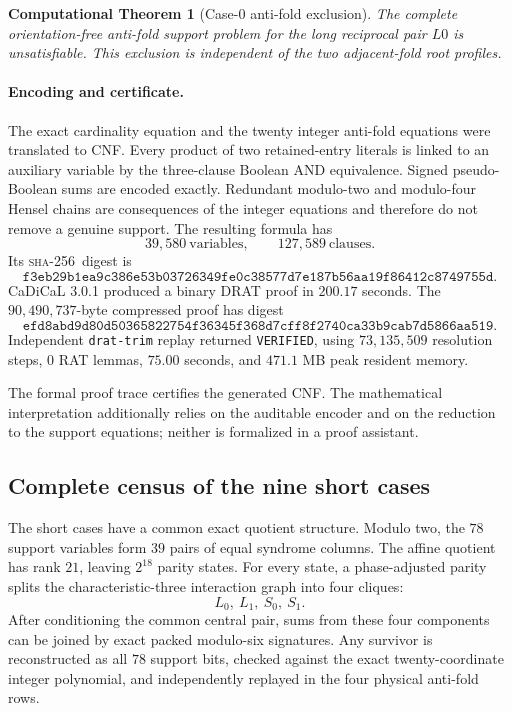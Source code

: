 \documentclass[11pt]{article}
\newtheorem{computationaltheorem}[theorem]{Computational Theorem}
\theoremstyle{remark}
\newcommand{\sha}{\textsc{sha-256}}
\begin{document}
\begin{computationaltheorem}[Case-$0$ anti-fold exclusion]
\label{thm:case0}
The complete orientation-free anti-fold support problem for the long
reciprocal pair $L0$ is unsatisfiable.  This exclusion is independent of
the two adjacent-fold root profiles.
\end{computationaltheorem}

\paragraph{Encoding and certificate.}
The exact cardinality equation and the twenty integer anti-fold equations
were translated to CNF.  Every product of two retained-entry literals is
linked to an auxiliary variable by the three-clause Boolean AND
equivalence.  Signed pseudo-Boolean sums are encoded exactly.  Redundant
modulo-two and modulo-four Hensel chains are consequences of the integer
equations and therefore do not remove a genuine support.  The resulting
formula has
\[
 39{,}580\ \text{variables},\qquad
 127{,}589\ \text{clauses}.
\]
Its \sha\ digest is
\[
\texttt{f3eb29b1ea9c386e53b03726349fe0c38577d7e187b56aa19f86412c8749755d}.
\]
CaDiCaL 3.0.1 produced a binary DRAT proof in $200.17$ seconds.  The
$90{,}490{,}737$-byte compressed proof has digest
\[
\texttt{efd8abd9d80d50365822754f36345f368d7cff8f2740ca33b9cab7d5866aa519}.
\]
Independent \texttt{drat-trim} replay returned \texttt{VERIFIED}, using
$73{,}135{,}509$ resolution steps, $0$ RAT lemmas, $75.00$ seconds, and
$471.1$ MB peak resident memory.

The formal proof trace certifies the generated CNF.  The mathematical
interpretation additionally relies on the auditable encoder and on the
reduction to the support equations; neither is formalized in a proof
assistant.

\subsection{Complete census of the nine short cases}

The short cases have a common exact quotient structure.  Modulo two, the
$78$ support variables form $39$ pairs of equal syndrome columns.  The
affine quotient has rank $21$, leaving $2^{18}$ parity states.  For every
state, a phase-adjusted parity splits the characteristic-three interaction
graph into four cliques:
\[
 L_0,\ L_1,\ S_0,\ S_1.
\]
After conditioning the common central pair, sums from these four components
can be joined by exact packed modulo-six signatures.  Any survivor is
reconstructed as all $78$ support bits, checked against the exact
twenty-coordinate integer polynomial, and independently replayed in the
four physical anti-fold rows.
\end{document}
